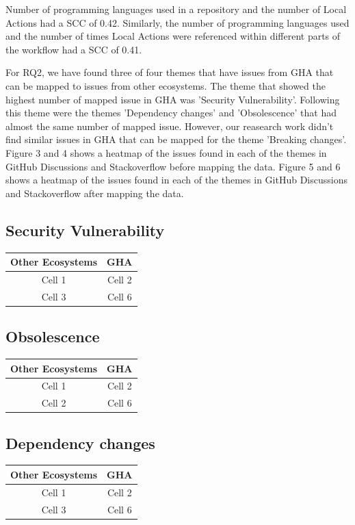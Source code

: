 \documentclass[conference]{IEEEtran}
\begin{document}
    Number of programming languages used in a repository and the number of Local Actions had a SCC of 0.42. Similarly, the number of programming languages used and the number of times Local Actions were referenced within different parts of the workflow had a SCC of 0.41.


For RQ2, we have found three of four themes that have issues from GHA that can be mapped to issues from other ecosystems. The theme that showed the highest number of mapped issue in GHA was 'Security Vulnerability'. Following this theme were the themes 'Dependency changes' and 'Obsolescence'  that had almost the same number of mapped issue. However, our reasearch work didn't find similar issues in GHA that can be mapped for the theme 'Breaking changes'. Figure 3 and 4 shows a heatmap of the issues found in each of the themes in GitHub Discussions and Stackoverflow before mapping the data. Figure 5 and 6 shows a heatmap of the issues found in each of the themes  in GitHub Discussions and Stackoverflow after mapping the data.



\subsection{Security Vulnerability}
\begin{tabular}{|c|c|}
  \hline
  \textbf{Other Ecosystems} & \textbf{GHA} \\
  \hline
  \hline
    Cell 1 & Cell 2  \\
  \hline
    Cell 3 & Cell 6 \\
  \hline
 
\end{tabular}
\subsection{Obsolescence}
\begin{tabular}{|c|c|}
  \hline
  \textbf{Other Ecosystems} & \textbf{GHA} \\
  \hline
  \hline
    Cell 1 & Cell 2  \\
  \hline
    Cell 2 & Cell 6 \\
  \hline

\end{tabular}
\subsection{Dependency changes}
\begin{tabular}{|c|c|}
  \hline
  \textbf{Other Ecosystems} & \textbf{GHA} \\
  \hline
  \hline
    Cell 1 & Cell 2  \\
  \hline
   Cell 3 & Cell 6 \\
  \hline

\end{tabular}
\end{document}
